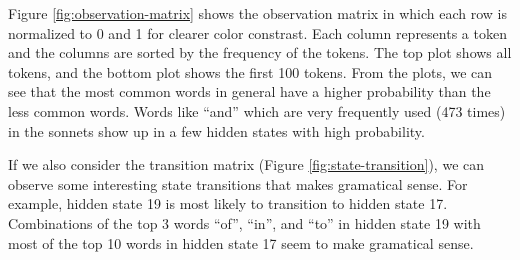 Figure \ref{fig:observation-matrix} shows the observation matrix in which each row is normalized to 0 and 1 for clearer color constrast. Each column represents a token and the columns are sorted by the frequency of the tokens. The top plot shows all tokens, and the bottom plot shows the first 100 tokens. From the plots, we can see that the most common words in general have a higher probability than the less common words. Words like ``and'' which are very frequently used (473 times) in the sonnets show up in a few hidden states with high probability.

If we also consider the transition matrix (Figure \ref{fig:state-transition}), we can observe some interesting state transitions that makes gramatical sense. For example, hidden state 19 is most likely to transition to hidden state 17. Combinations of the top 3 words ``of'', ``in'', and ``to'' in hidden state 19 with most of the top 10 words in hidden state 17 seem to make gramatical sense.


